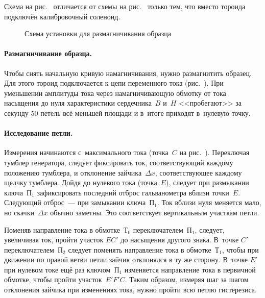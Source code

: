 Схема на рис.~ отличается от схемы на
рис.~ только тем, что вместо тороида
подключён калибровочный соленоид.

\begin{wrapfigure}[8]{r}{0.45\textwidth}
	\caption{Схема установки для размагничивания образца}
\end{wrapfigure}

%

\paragraph{Размагничивание образца.}
Чтобы снять начальную кривую намагничивания, нужно размагнитить образец.
Для этого тороид подключается к цепи переменного тока
(рис.~). При уменьшении амплитуды тока через
намагничивающую обмотку от тока насыщения до нуля характеристики сердечника~$B$
и~$H$ <<пробегают>> за секунду 50 петель всё меньшей площади и в~итоге
приходят в~нулевую точку.

\paragraph{Исследование петли.}
Измерения начинаются с~максимального тока (точка~$C$ на рис.~). Переключая тумблер генератора,
следует фиксировать ток, соответствующий каждому положению тумблера, и
отклонение зайчика~$\Delta x$, соответствующее
каждому щелчку тумблера. Дойдя до нулевого тока
(точка~$E$), следует при размыкании ключа~$\text{П}_1$ зафиксировать последний
отброс гальванометра вблизи точки~$E$. Следующий
отброс~--- при замыкании ключа~$\text{П}_1$. Ток вблизи нуля меняется мало, но
скачки~$\Delta x$ обычно заметны. Это соответствует
вертикальным участкам петли.

Поменяв направление тока в обмотке~Т$_0$ переключателем~$\text{П}_1$,
следует, увеличивая ток, пройти участок $EC'$ до
насыщения другого знака. В~точке $C'$ переключателем~$\text{П}_2$ следует
поменять направление тока в обмотке~$Т_{1}$, чтобы при
движении по правой ветви петли зайчик отклонялся в ту же сторону. В~точке $E'$
при нулевом токе ещё раз ключом~$\text{П}_1$
изменяется направление тока в первичной обмотке, чтобы пройти участок~$E'F'C$.
Таким образом, измеряя шаг за шагом
отклонения зайчика при изменениях тока, нужно пройти всю петлю гистерезиса.

